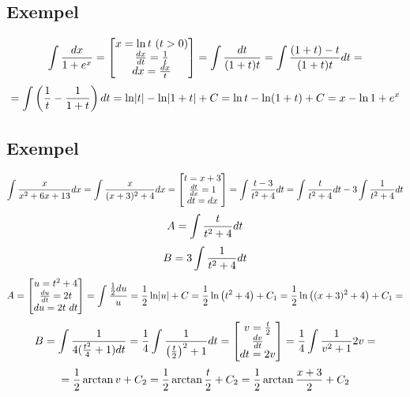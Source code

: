 \documentclass{article}
\begin{document}
\subsection{Exempel}
$$ \int{dx \over 1+e^x} = \bmat{x=\ln t\ (t>0)\\ \f{dx}{dt} = \f 1t \\ dx = \f{dx}t} = \int{dt \over (1+t)t} = \int{\f{(1+t)-t}{(1+t)t}dt}  =$$
$$=\int{\left(\frac{1}{t} - \frac{1}{1+t}\right)dt} = \ln \lvert t\rvert - \ln \lvert1+t\rvert + C = \ln t - \ln (1+t) + C = x - \ln {1+e^x}$$

\subsection{Exempel}
$$ \int{\frac{x}{x^2 + 6x + 13}dx} = \int{\frac{x}{(x+3)^2+4}dx} = \left[\begin{matrix} t=x+3 \\ \frac{dt}{dx} = 1 \\  dt=dx\end{matrix}\right] =\int{\frac{t-3}{t^2+4}dt} = \int{\frac{t}{t^2+4}dt} - 3\int{\frac{1}{t^2+4}dt}$$
$$A = \int{\frac{t}{t^2+4}dt}$$
$$B = 3\int{\frac{1}{t^2+4}dt}$$
$$ A=\left[\begin{matrix}u=t^2+4 \\ \frac{du}{dt} = 2t \\ du=2t\ dt\end{matrix}\right] = \int{\frac{1}{2} du \over u} = \frac{1}{2} \ln \lvert u\rvert + C = \frac{1}{2} \ln\left(t^2+4\right)+C_1 = \frac{1}{2} \ln\left((x+3)^2+4\right) + C_1 =$$
$$ B=\int{\frac{1}{4(\frac{t^2}{4} + 1)dt }= \frac{1}{4} \int{\frac{1}{\left(\frac{t}{2}\right)^2 + 1} dt}} = \left[\begin{matrix}v=\frac{t}{2} \\ \frac{dv}{dt} \\ dt=2v\end{matrix}\right] = \frac{1}{4} \int{\frac{1}{v^2+1} 2v} = $$
$$=\frac{1}{2} \arctan v + C_2 = \frac{1}{2} \arctan \frac{t}{2} + C_2 = \frac{1}{2} \arctan \frac{x+3}{2} + C_2 $$
\end{document}
